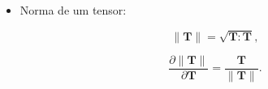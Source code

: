 \documentclass[_ArquivoPrincipal.tex]{subfiles}
\begin{document}
\begin{itemize}[leftmargin=\parindent,labelwidth=\parindent,labelsep=0.3cm]
	\item Norma de um tensor:

	      \begin{equation}\label{eq:dnorm}
		      \|\mathbf{T}\|=\sqrt{\mathbf{T}:\mathbf{T}} ,
	      \end{equation}

	      \begin{equation}
		      \dfrac{\partial\| \mathbf{T} \|}{\partial \mathbf{T}} =
		      \dfrac{\mathbf{T}}{\| \mathbf{T} \|} .
	      \end{equation}

\end{itemize}

\end{document}
